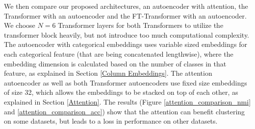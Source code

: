 We then compare our proposed architectures, an autoencoder with attention, the Transformer with an autoencoder and the FT-Transformer with an autoencoder. We choose $N = 6$ Transformer layers for both Transformers to utilize the transformer block heavily, but not introduce too much computational complexity. The autoencoder with categorical embeddings uses variable sized embeddings for each categorical feature (that are being concatenated lengthwise), where the embedding dimension is calculated based on the number of classes in that feature, as explained in Section \ref{Column Embeddings}. The attention autoencoder as well as both Transformer autoencoders use fixed size embeddings of size 32, which allows the embeddings to be stacked on top of each other, as explained in Section \ref{Attention}. The results (Figure \ref{attention_comparison_nmi} and \ref{attention_comparison_acc}) show that the attention can benefit clustering on some datasets, but leads to a loss in performance on other datasets.

